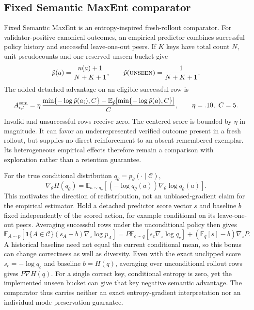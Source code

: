 \documentclass{article}
\newcommand{\1}{\mathbf 1}
\newcommand{\E}{\mathbb E}
\theoremstyle{remark}
\theoremstyle{definition}
\theoremstyle{plain}
\begin{document}
\subsection{Fixed Semantic MaxEnt comparator}
\label{app:semantic-maxent}
\label{app:semantic-score}

Fixed Semantic MaxEnt is an entropy-inspired fresh-rollout comparator.
For validator-positive canonical outcomes, an empirical predictor combines
successful policy history and successful leave-one-out peers. If $K$ keys
have total count $N$, unit pseudocounts and one reserved unseen bucket give
\begin{equation}
  \hat p(a)=\frac{n(a)+1}{N+K+1},\qquad
  \hat p(\textsc{unseen})=\frac{1}{N+K+1}.
  \label{eq:open-set-predictor}
\end{equation}
The added detached advantage on an eligible successful row is
\begin{equation}
  A^{\rm sem}_{i,t}=\eta\,
  \frac{\min\{-\log\hat p(a_i),C\}
    -\E_{\hat p}[\min\{-\log\hat p(a),C\}]}{C},
  \qquad \eta=.10,\ C=5.
  \label{eq:legacy-semantic-advantage}
\end{equation}
\label{app:legacy-semantic-estimator}
\label{app:semantic-estimator}
Invalid and unsuccessful rows receive zero. The centered score is bounded
by $\eta$ in magnitude. It can favor an underrepresented verified outcome
present in a fresh rollout, but supplies no direct reinforcement to an
absent remembered exemplar. Its heterogeneous empirical effects therefore
remain a comparison with exploration rather than a retention guarantee.

For the true conditional distribution $q_\theta=p_\theta(\cdot\mid\mathcal C)$,
\begin{equation}
 \nabla_\theta H(q_\theta)
 =\E_{a\sim q_\theta}[(-\log q_\theta(a))\nabla_\theta\log q_\theta(a)].
 \label{eq:entropy-score-function}
\end{equation}
This motivates the direction of redistribution, not an unbiased-gradient
claim for the empirical estimator. Hold a detached predictor score vector
$s$ and baseline $b$ fixed independently of the scored action, for example
conditional on its leave-one-out peers. Averaging successful rows under the
unconditional policy then gives
\[
 \E_{A\sim p}[\1\{A\in\mathcal C\}(s_A-b)\nabla_z\log p_A]
 =P\E_{c\sim q}[s_c\nabla_z\log q_c]
   +(\E_q[s]-b)\nabla_zP.
\]
A historical baseline need not equal the current conditional mean, so this
bonus can change correctness as well as diversity. Even with the exact
unclipped score $s_c=-\log q_c$ and baseline $b=H(q)$, averaging over
unconditional rollout rows gives $P\nabla H(q)$.
For a single correct key, conditional entropy is zero, yet the implemented
unseen bucket can give that key negative semantic advantage. The comparator
thus carries neither an exact entropy-gradient interpretation nor an
individual-mode preservation guarantee.
\end{document}

